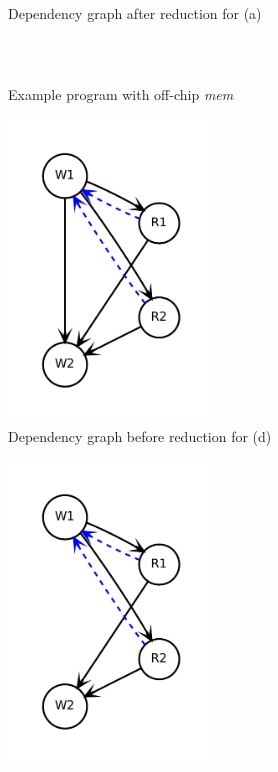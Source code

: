 \begin{figure}
\begin{subfigure}[b]{0.3\textwidth}
\caption{
  Dependency graph after reduction for (a)
}
\end{subfigure}
\\
\begin{subfigure}[b]{0.34\textwidth}
\inputminted{python}{code/graphred2.py}
\caption{
  Example program with off-chip \emph{mem}
}
\end{subfigure}
\begin{subfigure}[b]{0.3\textwidth}
  \centering
\includegraphics[width=0.6\textwidth]{figs/graphred2.pdf}
\caption{
  Dependency graph before reduction for (d)
}
\end{subfigure}
\begin{subfigure}[b]{0.3\textwidth}
  \centering
\includegraphics[width=0.6\textwidth]{figs/graphred2_after.pdf}

\end{subfigure}
\end{figure}
